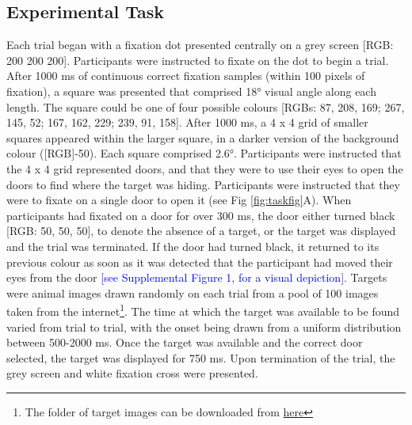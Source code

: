 \documentclass[
  man]{apa6}
\begin{document}
\hypertarget{experimental-task}{%
\subsection{Experimental Task}\label{experimental-task}}

\label{sec:Experimental Task}

Each trial began with a fixation dot presented centrally on a grey screen {[}RGB: 200 200 200{]}. Participants were instructed to fixate on the dot to begin a trial. After 1000 ms of continuous correct fixation samples (within 100 pixels of fixation), a square was presented that comprised 18° visual angle along each length. The square could be one of four possible colours {[}RGBs: 87, 208, 169; 267, 145, 52; 167, 162, 229; 239, 91, 158{]}. After 1000 ms, a 4 x 4 grid of smaller squares appeared within the larger square, in a darker version of the background colour ({[}RGB{]}-50). Each square comprised 2.6°. Participants were instructed that the 4 x 4 grid represented doors, and that they were to use their eyes to open the doors to find where the target was hiding. Participants were instructed that they were to fixate on a single door to open it (see Fig \ref{fig:taskfig}A). When participants had fixated on a door for over 300 ms, the door either turned black {[}RGB: 50, 50, 50{]}, to denote the absence of a target, or the target was displayed and the trial was terminated. If the door had turned black, it returned to its previous colour as soon as it was detected that the participant had moved their eyes from the door \textcolor{blue}{[see Supplemental Figure 1, for a visual depiction]}. Targets were animal images drawn randomly on each trial from a pool of 100 images taken from the internet\footnote{The folder of target images can be downloaded from \href{https://github.com/kel-github/variability-decision-making/blob/master/iforage_DA_task_code_redSMI/tgt0-100.zip}{here}}. The time at which the target was available to be found varied from trial to trial, with the onset being drawn from a uniform distribution between 500-2000 ms. Once the target was available and the correct door selected, the target was displayed for 750 ms. Upon termination of the trial, the grey screen and white fixation cross were presented.
\end{document}
